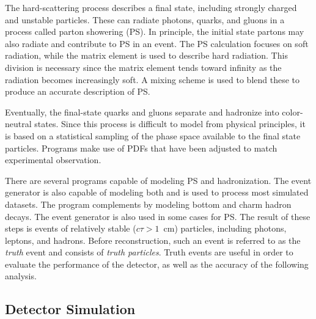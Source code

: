 The hard-scattering process describes a final state, including strongly charged and unstable particles.
These can radiate photons, quarks, and gluons in a process called parton showering (PS).
In principle, the initial state partons may also radiate and contribute to PS in an event.
The PS calculation focuses on soft radiation, while the matrix element is used to describe hard radiation.
This division is necessary since the matrix element tends toward infinity as the radiation becomes increasingly soft.
A mixing scheme is used to blend these to produce an accurate description of PS.

Eventually, the final-state quarks and gluons separate and hadronize into color-neutral states.
Since this process is difficult to model from physical principles, it is based on a statistical sampling of the phase space available to the final state particles.
Programs make use of PDFs that have been adjusted to match experimental observation.

There are several programs capable of modeling PS and hadronization.
The event generator \pythia is also capable of modeling both and is used to process most simulated datasets.
The program \evtgen \cite{Lange:2001uf} complements \pythia by modeling bottom and charm hadron decays.
The event generator \sherpa is also used in some cases for PS.
The result of these steps is events of relatively stable ($c\tau>1$~cm) particles, including photons, leptons, and hadrons.
Before reconstruction, such an event is referred to as the \emph{truth} event and consists of \emph{truth particles}.
Truth events are useful in order to evaluate the performance of the detector, as well as the accuracy of the following analysis.



\subsection{Detector Simulation} \label{sec:geant}

